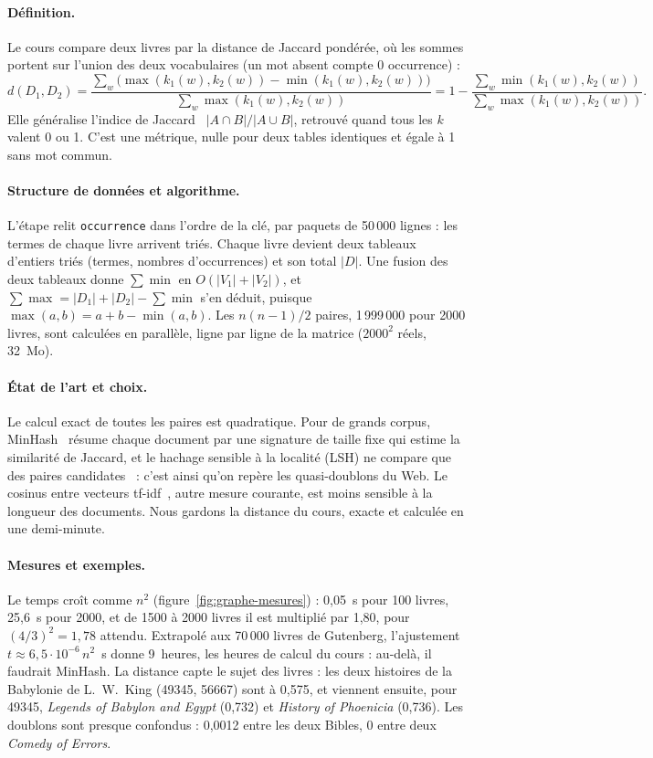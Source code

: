\paragraph{Définition.} Le cours compare deux livres par la
distance de Jaccard pondérée, où les sommes portent sur l'union des deux
vocabulaires (un mot absent compte 0 occurrence) :
\[
  d(D_1, D_2)
  = \frac{\sum_w \big(\max(k_1(w), k_2(w)) - \min(k_1(w), k_2(w))\big)}{\sum_w \max(k_1(w), k_2(w))}
  = 1 - \frac{\sum_w \min(k_1(w), k_2(w))}{\sum_w \max(k_1(w), k_2(w))}.
\]
Elle généralise l'indice de Jaccard~\cite{jaccard} $|A \cap B| / |A \cup B|$,
retrouvé quand tous les $k$ valent 0 ou 1. C'est une métrique, nulle pour deux
tables identiques et égale à 1 sans mot commun.

\paragraph{Structure de données et algorithme.} L'étape relit \texttt{occurrence}
dans l'ordre de la clé, par paquets de 50\,000 lignes : les termes de chaque
livre arrivent triés. Chaque livre devient deux tableaux d'entiers triés
(termes, nombres d'occurrences) et son total $|D|$. Une fusion des deux tableaux
donne $\sum \min$ en $O(|V_1| + |V_2|)$, et
$\sum \max = |D_1| + |D_2| - \sum \min$ s'en déduit, puisque
$\max(a, b) = a + b - \min(a, b)$. Les $n(n-1)/2$ paires, 1\,999\,000 pour 2000
livres, sont calculées en parallèle, ligne par ligne de la matrice ($2000^2$
réels, 32~Mo).

\paragraph{État de l'art et choix.} Le calcul exact de toutes les paires est
quadratique. Pour de grands corpus, MinHash~\cite{broder} résume chaque document
par une signature de taille fixe qui estime la similarité de Jaccard, et le
hachage sensible à la localité (LSH) ne compare que des paires
candidates~\cite{mmds} : c'est ainsi qu'on repère les quasi-doublons du Web. Le
cosinus entre vecteurs tf-idf~\cite{iir}, autre mesure courante, est moins
sensible à la longueur des documents. Nous gardons la distance du cours, exacte
et calculée en une demi-minute.

\paragraph{Mesures et exemples.} Le temps croît comme $n^2$
(figure~\ref{fig:graphe-mesures}) : 0,05~s pour 100 livres, 25,6~s pour 2000,
et de 1500 à 2000 livres il est multiplié par 1,80, pour $(4/3)^2 = 1{,}78$
attendu. Extrapolé aux 70\,000 livres de Gutenberg, l'ajustement
$t \approx 6{,}5 \cdot 10^{-6}\,n^2$~s donne 9~heures, les \og heures de calcul
\fg{} du cours : au-delà, il faudrait MinHash. La distance capte le sujet des
livres : les deux histoires de la Babylonie de L.~W.~King (49345, 56667) sont à
0,575, et viennent ensuite, pour 49345, \emph{Legends of Babylon and Egypt}
(0,732) et \emph{History of Phoenicia} (0,736). Les doublons sont presque
confondus : 0,0012 entre les deux Bibles, 0 entre deux \emph{Comedy of Errors}.

